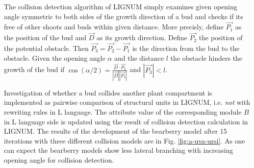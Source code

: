 The  collision detection  algorithm  of LIGNUM  simply examines  given
opening angle symmetric to both sides of the growth direction of a bud
and checks if its free of other shoots and buds within given distance.
More  precisly, define $\vec  {P_1}$ as  the position  of the  bud and
$\vec D$ as its growth  direction. Define $\vec {P_2}$ the position of
the potential obstacle. Then $\vec {P_3} = \vec {P_2} - \vec {P_1}$ is
the direction from  the bud to the obstacle.   Given the opening angle
$\alpha$ and the  distance $l$ the obstacle hinders  the growth of the
bud  if $\cos(\alpha/2) =  \frac{{\vec D}  \cdot {\vec  {P_3}}} {|\vec
D||\vec {P_3}|}$ and $|\vec {P_3}| < l$.

Investigation of  whether a bud collides another  plant compartment is
implemented  as pairwise  comparison  of structural  units in  LIGNUM,
i.e. \textsl{not}  with rewriting rules in L  language.  The attribute
value of  the corresponding module $B$  in L language  side is updated
using  the result of  collision detection  calculation in  LIGNUM. The
results of the development of  the bearberry model after 15 iterations
with     three      different     collision     models      are     in
Fig.  \ref{fig:a-uva-ursi}.  As  one can  expect the  bearberry models
show  less  lateral  branching   with  increasing  opening  angle  for
collision detection.
 

















